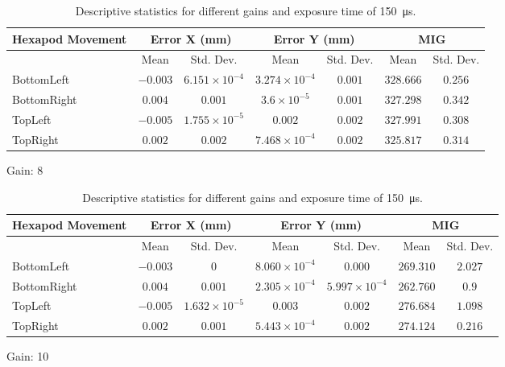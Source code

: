 \begin{table}[h]
    \vspace{10pt}

    \begin{subtable}{\textwidth}
        \centering
        \footnotesize
        \begin{tabular}{lcccccc}
            \toprule
            Hexapod Movement & \multicolumn{2}{c}{Error X (mm)} & \multicolumn{2}{c}{Error Y (mm)} & \multicolumn{2}{c}{MIG}  \\
            \midrule
            & \multicolumn{1}{c}{Mean} & \multicolumn{1}{c}{Std. Dev.} & \multicolumn{1}{c}{Mean} & \multicolumn{1}{c}{Std. Dev.} & \multicolumn{1}{c}{Mean} & \multicolumn{1}{c}{Std. Dev.} \\
            \midrule
            \textsf{BottomLeft} & $-0.003$ & $6.151\times10^{-4}$ & $3.274\times10^{-4}$ & $0.001$ & $328.666$ & $0.256$ \\
            \textsf{BottomRight} & $0.004$ & $0.001$ & $3.6\times10^{-5}$ & $0.001$ & $327.298$ & $0.342$ \\
            \textsf{TopLeft} & $-0.005$ & $1.755\times10^{-5}$ & $0.002$ & $0.002$ & $327.991$ & $0.308$ \\
            \textsf{TopRight} & $0.002$ & $0.002$ & $7.468\times10^{-4}$ & $0.002$ & $325.817$ & $0.314$ \\
            \bottomrule
        \end{tabular}
        \caption{Gain: 8}
    \end{subtable}

    \vspace{10pt}

    \begin{subtable}{\textwidth}
        \centering
        \footnotesize
        \begin{tabular}{lcccccc}
            \toprule
            Hexapod Movement & \multicolumn{2}{c}{Error X (mm)} & \multicolumn{2}{c}{Error Y (mm)} & \multicolumn{2}{c}{MIG}  \\
            \midrule
            & \multicolumn{1}{c}{Mean} & \multicolumn{1}{c}{Std. Dev.} & \multicolumn{1}{c}{Mean} & \multicolumn{1}{c}{Std. Dev.} & \multicolumn{1}{c}{Mean} & \multicolumn{1}{c}{Std. Dev.} \\
            \midrule
            \textsf{BottomLeft} & $-0.003$ & $0$ & $8.060\times10^{-4}$ & $0.000$ & $269.310$ & $2.027$ \\
            \textsf{BottomRight} & $0.004$ & $0.001$ & $2.305\times10^{-4}$ & $5.997\times10^{-4}$ & $262.760$ & $0.9$ \\
            \textsf{TopLeft} & $-0.005$ & $1.632\times10^{-5}$ & $0.003$ & $0.002$ & $276.684$ & $1.098$ \\
            \textsf{TopRight} & $0.002$ & $0.001$ & $5.443\times10^{-4}$ & $0.002$ & $274.124$ & $0.216$ \\
            \bottomrule
        \end{tabular}
        \caption{Gain: 10}
    \end{subtable}

    \caption{Descriptive statistics for different gains and exposure time of \SI{150}{\micro\second}.}
    \label{table:stats_matrix_gain}
\end{table}

